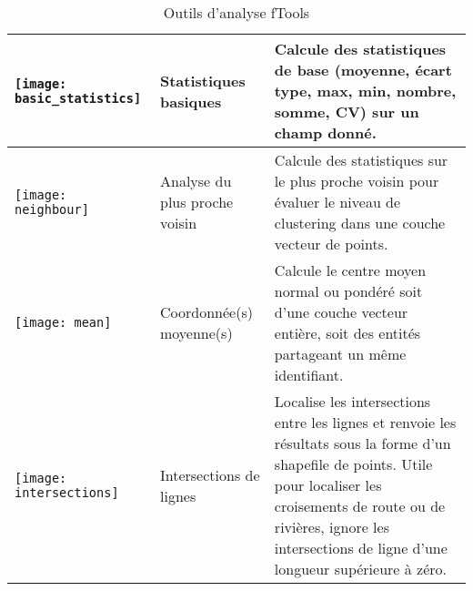 \begin{table}[ht]
\begin{tabular}{|m{1cm}|m{3cm}|m{9cm}|}
 \hline \texttt{[image: basic\_statistics]} & Statistiques basiques & Calcule des statistiques de base (moyenne, écart type, max, min, nombre, somme, CV) sur un champ donné. \\ 
 \hline \texttt{[image: neighbour]} & Analyse du plus proche voisin & Calcule des statistiques sur le plus proche voisin pour évaluer le niveau de clustering dans une couche vecteur de points. \\
 \hline \texttt{[image: mean]} & Coordonnée(s) moyenne(s) & Calcule le centre moyen normal ou pondéré soit d'une couche vecteur entière, soit des entités partageant un même identifiant. \\ 
 \hline \texttt{[image: intersections]} & Intersections de lignes & Localise les intersections entre les lignes et renvoie les résultats sous la forme d'un shapefile de points. Utile pour localiser les croisements de route ou de rivières, ignore les intersections de ligne d'une longueur supérieure à zéro. \\
 \hline
\end{tabular}
\caption{Outils d'analyse fTools}\label{tab:ftool_analysis}
\end{table}


